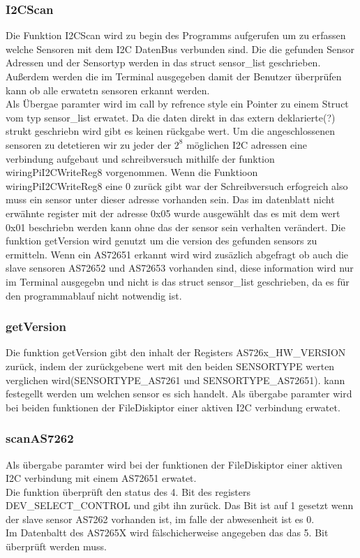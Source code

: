 \subsubsection{I2CScan}
Die Funktion I2CScan wird zu begin des Programms aufgerufen um zu erfassen welche Sensoren mit dem I2C DatenBus verbunden sind.
Die die gefunden Sensor Adressen und der Sensortyp werden in das struct sensor\_list geschrieben.\\
Außerdem werden die im Terminal ausgegeben damit der Benutzer überprüfen kann ob alle erwatetn sensoren erkannt werden.\\
Als Übergae paramter wird im call by refrence style ein Pointer zu einem Struct vom typ sensor\_list erwatet.
Da die daten direkt in das extern deklarierte(?) strukt geschriebn wird gibt es keinen rückgabe wert.
Um die angeschlossenen sensoren zu detetieren wir zu jeder der $2^8$ möglichen I2C adressen eine verbindung aufgebaut und schreibversuch mithilfe der funktion wiringPiI2CWriteReg8 vorgenommen.
Wenn die Funktioon wiringPiI2CWriteReg8 eine 0 zurück gibt war der Schreibversuch erfogreich also muss ein sensor unter dieser adresse vorhanden sein.
Das im datenblatt nicht erwähnte register mit der adresse 0x05 wurde ausgewählt das es mit dem wert 0x01 beschriebn werden kann ohne das der sensor sein verhalten verändert.
Die funktion getVersion wird genutzt um die version des gefunden sensors zu ermitteln.
Wenn ein AS72651 erkannt wird wird zusäzlich abgefragt ob auch die slave sensoren AS72652 und AS72653 vorhanden sind, diese information wird nur im Terminal ausgegebn und nicht is das struct sensor\_list geschrieben, da es für den programmablauf nicht notwendig ist.
\subsubsection{getVersion}
Die funktion getVersion gibt den inhalt der Registers AS726x\_HW\_VERSION zurück, indem der zurückgebene wert mit den beiden SENSORTYPE werten verglichen wird(SENSORTYPE\_AS7261 und SENSORTYPE\_AS72651). kann festegellt werden um welchen sensor es sich handelt. 
Als übergabe paramter wird bei beiden funktionen der FileDiskiptor einer aktiven I2C verbindung erwatet.\\

\subsubsection{scanAS7262}
Als übergabe paramter wird bei der funktionen der FileDiskiptor einer aktiven I2C verbindung mit einem AS72651 erwatet.\\
Die funktion überprüft den status des 4. Bit des registers DEV\_SELECT\_CONTROL und gibt ihn zurück. Das Bit ist auf 1 gesetzt wenn der slave sensor AS7262 vorhanden ist, im falle der abwesenheit ist es 0.\\
Im Datenbaltt des AS7265X wird fälschicherweise angegeben das das 5. Bit überprüft werden muss.

